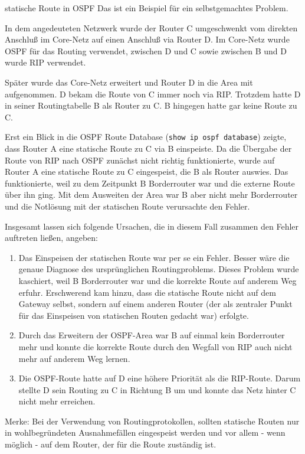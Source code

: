 \begin{normaltext}
  \begin{Beispiel}{statische Route in OSPF}
    Das ist ein Beispiel für ein selbstgemachtes Problem.


    In dem angedeuteten Netzwerk wurde der Router C umgeschwenkt vom direkten
    Anschluß im Core-Netz auf einen Anschluß via Router D. Im Core-Netz wurde
    OSPF für das Routing verwendet, zwischen D und C sowie zwischen B und D
    wurde RIP verwendet.

    Später wurde das Core-Netz erweitert und Router D in die Area mit
    aufgenommen. D bekam die Route von C immer noch via RIP. Trotzdem hatte D
    in seiner Routingtabelle B als Router zu C. B hingegen hatte gar keine
    Route zu C.

    Erst ein Blick in die OSPF Route Database (\verb?show ip ospf database?)
    zeigte, dass Router A eine statische Route zu C via B einspeiste.
    Da die Übergabe der Route von RIP nach OSPF zunächst nicht
    richtig funktionierte, wurde auf Router A eine statische Route zu C
    eingespeist, die B als Router auswies. Das funktionierte, weil zu dem
    Zeitpunkt B Borderrouter war und die externe Route über ihn ging. Mit dem
    Ausweiten der Area war B aber nicht mehr Borderrouter und die Notlösung
    mit der statischen Route verursachte den Fehler.

    Insgesamt lassen sich folgende Ursachen, die in diesem Fall zusammen den
    Fehler auftreten ließen, angeben:
    \begin{enumerate}
      \item Das Einspeisen der statischen Route war per se ein Fehler. Besser
        wäre die genaue Diagnose des ursprünglichen Routingproblems. Dieses
        Problem wurde kaschiert, weil B Borderrouter war und die korrekte
        Route auf anderem Weg erfuhr. Erschwerend kam hinzu, dass die
        statische Route nicht auf dem Gateway selbst, sondern auf einem
        anderen Router (der als zentraler Punkt für das Einspeisen von
        statischen Routen gedacht war) erfolgte.
      \item Durch das Erweitern der OSPF-Area war B auf einmal kein
        Borderrouter mehr und konnte die korrekte Route durch den Wegfall von
        RIP auch nicht mehr auf anderem Weg lernen.
      \item Die OSPF-Route hatte auf D eine höhere Priorität als die
        RIP-Route. Darum stellte D sein Routing zu C in Richtung B um und
        konnte das Netz hinter C nicht mehr erreichen.
    \end{enumerate}
    Merke: Bei der Verwendung von Routingprotokollen, sollten statische Routen
    nur in wohlbegründeten Ausnahmefällen eingespeist werden und vor allem -
    wenn möglich - auf dem Router, der für die Route zuständig ist.
  \end{Beispiel}
\end{normaltext}


